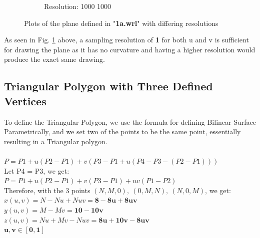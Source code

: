 \documentclass[acmlarge,nonacm=true]{acmart}
\begin{document}
\begin{figure}[H]
\begin{subfigure}{.33\textwidth}
		\caption{Resolution: 1000 1000}
	  \end{subfigure}
	\caption{Plots of the plane defined in "\textbf{1a.wrl}" with differing resolutions}
	\label{fig:1a}
\end{figure}
As seen in Fig. \ref{fig:1a} above, a sampling resolution of \textbf{1} for both u and v is 
sufficient for drawing the plane as it has no curvature and having a higher resolution would
produce the exact same drawing.

\subsection{Triangular Polygon with Three Defined Vertices}
To define the Triangular Polygon, we use the formula for defining Bilinear Surface Parametrically,
and we set two of the points to be the same point, essentially resulting in a Triangular polygon.\\\\
\(P = P1 + u(P2-P1) + v(P3-P1+u(P4-P3-(P2-P1)))\)\\
Let P4 = P3, we get:\\
\(P = P1 + u(P2 - P1) + v(P3 - P1) + uv(P1 - P2)\)\\
Therefore, with the 3 points \((N, M, 0),\ (0, M, N),\ (N, 0, M)\), we get:\\
\(x(u,v) = N - Nu + Nuv = \mathbf{8 - 8u + 8uv}\)\\
\(y(u,v) = M - Mv = \mathbf{10 - 10v}\)\\
\(z(u,v) = Nu + Mv - Nuv = \mathbf{8u + 10v - 8uv}\)\\
\(\mathbf{u,v \in [0,1]}\)
\end{document}
